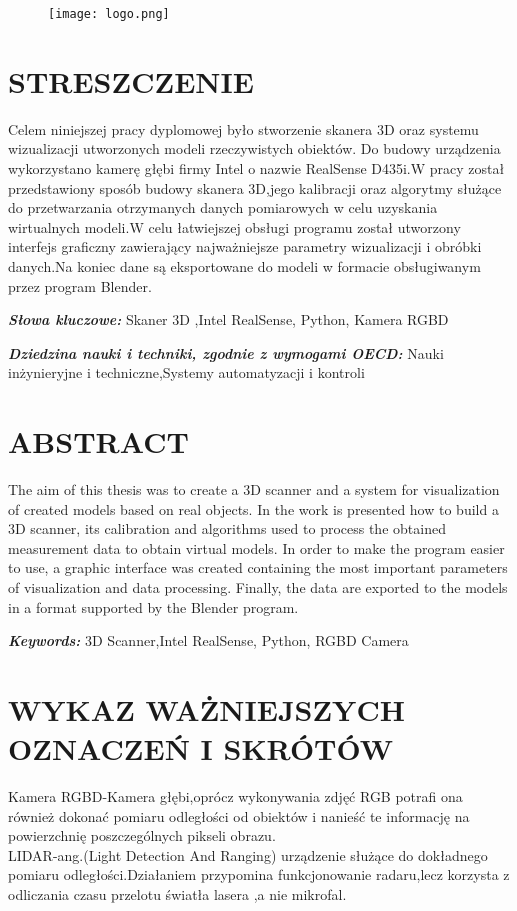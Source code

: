 \documentclass[12pt]{article}
\providecommand{\keywordspl}[1]
{
  \small	
  \textbf{\textit{Słowa kluczowe:}} #1
}
\providecommand{\keywordseng}[1]
{
  \small	
  \textbf{\textit{Keywords:}} #1
}
\providecommand{\dnauki}[1]
{
  \small	
  \textbf{\textit{Dziedzina nauki i techniki, zgodnie z wymogami OECD:}} #1
}
\begin{document}
\begin{figure}[H]
  \centering
  \texttt{[image: logo.png]}
  \label{fig:picture}
\end{figure}

\newpage

 
\section*{STRESZCZENIE}
Celem niniejszej pracy dyplomowej było stworzenie skanera 3D oraz systemu wizualizacji utworzonych modeli rzeczywistych obiektów. Do budowy urządzenia wykorzystano kamerę głębi firmy Intel o nazwie RealSense D435i.W pracy został przedstawiony sposób budowy skanera 3D,jego kalibracji oraz algorytmy służące do przetwarzania otrzymanych danych pomiarowych w celu uzyskania wirtualnych modeli.W celu łatwiejszej obsługi programu został utworzony interfejs graficzny zawierający najważniejsze parametry wizualizacji i obróbki danych.Na koniec dane są eksportowane do modeli w formacie obsługiwanym przez program Blender.

\keywordspl{Skaner 3D ,Intel RealSense, Python, Kamera RGBD}

\dnauki{Nauki inżynieryjne i techniczne,Systemy automatyzacji i kontroli }

\section*{ABSTRACT}
The aim of this thesis was to create a 3D scanner and a system for visualization of created models based on real objects. In the work is presented how to build a 3D scanner, its calibration and algorithms used to process the obtained measurement data to obtain virtual models. In order to make the program easier to use, a graphic interface was created containing the most important parameters of visualization and data processing. Finally, the data are exported to the models in a format supported by the Blender program.

\keywordseng{3D Scanner,Intel RealSense, Python, RGBD Camera}
\newpage
\tableofcontents





\newpage
\section{WYKAZ WAŻNIEJSZYCH OZNACZEŃ I SKRÓTÓW}

Kamera RGBD-Kamera głębi,oprócz wykonywania zdjęć RGB potrafi ona również dokonać pomiaru odległości od obiektów i nanieść te informację na powierzchnię poszczególnych pikseli obrazu.\\
LIDAR-ang.(Light Detection And Ranging) urządzenie służące do dokładnego pomiaru odległości.Działaniem przypomina funkcjonowanie radaru,lecz korzysta z odliczania czasu przelotu światła lasera ,a nie mikrofal.
\end{document}
